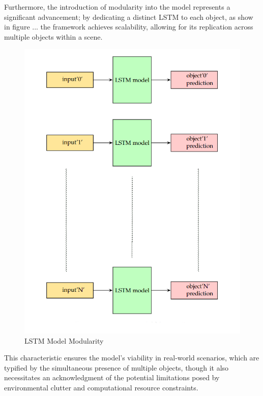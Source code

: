 Furthermore, the introduction of modularity into the model represents a significant advancement; by dedicating a distinct LSTM to each object, as show in figure ... the framework achieves scalability, allowing for its replication across multiple objects within a scene. \\
\begin{figure}[H]
  \centering
  
  \includegraphics[scale=0.5]{Figures/Chapter4/lstm_modularity.png}

  \caption{LSTM Model Modularity}
  \label{fig:LSTM Model Modularity}
\end{figure}




This characteristic ensures the model's viability in real-world scenarios, which are typified by the simultaneous presence of multiple objects, though it also necessitates an acknowledgment of the potential limitations posed by environmental clutter and computational resource constraints.

